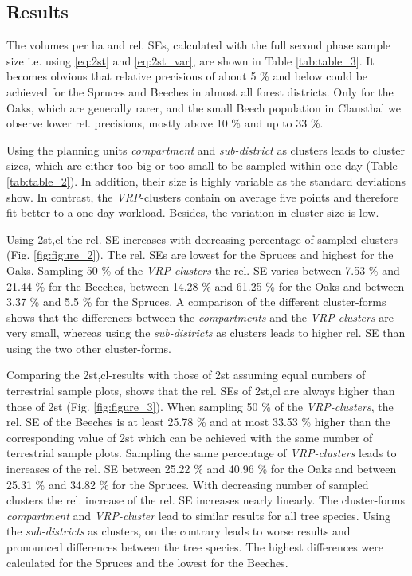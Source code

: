 \subsection{Results}
The volumes per ha and rel. SEs, calculated with the full second phase sample size i.e. using \eqref{eq:2st} and \eqref{eq:2st_var}, are shown in Table \ref{tab:table_3}. It becomes obvious that relative precisions of about 5 \% and below could be achieved for the Spruces and Beeches in almost all forest districts. Only for the Oaks, which are generally rarer, and the small Beech population in Clausthal we observe lower rel. precisions, mostly above 10 \% and up to 33 \%.

Using the planning units \textit{compartment} and \textit{sub-district} as clusters leads to cluster sizes, which are either too big or too small to be sampled within one day (Table \ref{tab:table_2}). In addition, their size is highly variable as the standard deviations show. In contrast, the \textit{VRP}-clusters contain on average five points and therefore fit better to a one day workload. Besides, the variation in cluster size is low.

Using 2st,cl the rel. SE increases with decreasing percentage of sampled clusters (Fig. \ref{fig:figure_2}). The rel. SEs are lowest for the Spruces and highest for the Oaks. Sampling 50 \% of the \textit{VRP-clusters} the rel. SE varies between 7.53 \% and 21.44 \% for the Beeches, between 14.28 \% and 61.25 \% for the Oaks and between 3.37 \% and 5.5 \% for the Spruces. A comparison of the different cluster-forms shows that the differences between the \textit{compartments} and the \textit{VRP-clusters} are very small, whereas using the \textit{sub-districts} as clusters leads to higher rel. SE than using the two other cluster-forms. 

Comparing the 2st,cl-results with those of 2st assuming equal numbers of terrestrial sample plots, shows that the rel. SEs of 2st,cl are always higher than those of 2st (Fig. \ref{fig:figure_3}). When sampling 50 \% of the \textit{VRP-clusters}, the rel. SE of the Beeches is at least 25.78 \% and at most 33.53 \% higher than the corresponding value of 2st which can be achieved with the same number of terrestrial sample plots. Sampling the same percentage of \textit{VRP-clusters} leads to increases of the rel. SE between 25.22 \% and 40.96 \% for the Oaks and between 25.31 \% and 34.82 \% for the Spruces. With decreasing number of sampled clusters the rel. increase of the rel. SE increases nearly linearly. The cluster-forms \textit{
compartment} and \textit{VRP-cluster} lead to similar results for all tree species. Using the \textit{sub-districts} as clusters, on the contrary leads to worse results and pronounced differences between the tree species. The highest differences were calculated for the Spruces and the lowest for the Beeches.

